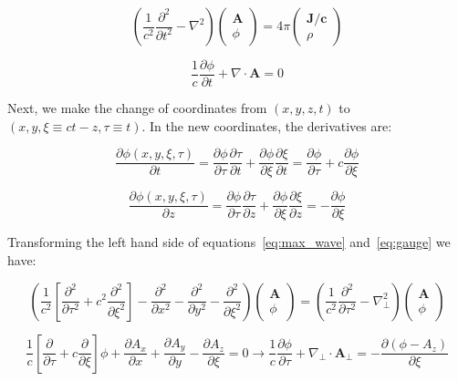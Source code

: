 \documentclass[aps,prl,preprint,groupedaddress]{revtex4-1}
\newcommand{\webvector}[2]{\left( \begin{array}{c} #1 \\ #2 \end{array} \right)}
\begin{document}
\begin{equation}\label{eq:max_wave}
\left( \frac{1}{c^2}\frac{\partial^2}{\partial t^2} - \nabla^2 \right) \webvector{\mathbf{A}}{\phi} = 4\pi \webvector{\mathbf{J/c}}{\rho}
\end{equation}

\begin{equation}\label{eq:gauge}
\frac{1}{c}\frac{\partial \phi}{\partial t} + \nabla \cdot \mathbf{A} = 0
\end{equation}

Next, we make the change of coordinates from $(x, y, z, t)$ to $(x, y, \xi \equiv ct - z, \tau \equiv t)$. In the new coordinates, the derivatives are:

\begin{equation}\label{eq:ddt}
\frac{\partial \phi(x, y, \xi, \tau)}{\partial t} = \frac{\partial \phi}{\partial \tau} \frac{\partial \tau}{\partial t} + \frac{\partial \phi}{\partial \xi} \frac{\partial \xi}{\partial t} = \frac{\partial \phi}{\partial \tau} + c\frac{\partial \phi}{\partial \xi} 
\end{equation}

\begin{equation}\label{eq:ddz}
\frac{\partial \phi(x, y, \xi, \tau)}{\partial z} = \frac{\partial \phi}{\partial \tau} \frac{\partial \tau}{\partial z} + \frac{\partial \phi}{\partial \xi} \frac{\partial \xi}{\partial z} = -\frac{\partial \phi}{\partial \xi} 
\end{equation}

Transforming the left hand side of equations~\ref{eq:max_wave} and~\ref{eq:gauge} we have:

\begin{equation}\label{eq:max_left}
\left( \frac{1}{c^2}\left[\frac{\partial^2}{\partial \tau^2} + c^2\frac{\partial^2}{\partial \xi^2}\right] - \frac{\partial^2}{\partial x^2} - \frac{\partial^2}{\partial y^2} - \frac{\partial^2}{\partial \xi^2}\right) \webvector{\mathbf{A}}{\phi} =  \left( \frac{1}{c^2}\frac{\partial^2}{\partial \tau^2} - \nabla^2_\perp \right) \webvector{\mathbf{A}}{\phi}
\end{equation}

\begin{equation}\label{eq:gauge_left}
\frac{1}{c}\left[\frac{\partial}{\partial \tau} + c\frac{\partial}{\partial \xi}\right]\phi + \frac{\partial A_x}{\partial x} + \frac{\partial A_y}{\partial y} - \frac{\partial A_z}{\partial \xi}  = 0 \rightarrow \frac{1}{c}\frac{\partial \phi}{\partial \tau} + \nabla_\perp \cdot \mathbf{A}_\perp = -\frac{\partial(\phi - A_z)}{\partial \xi}
\end{equation}
\end{document}
